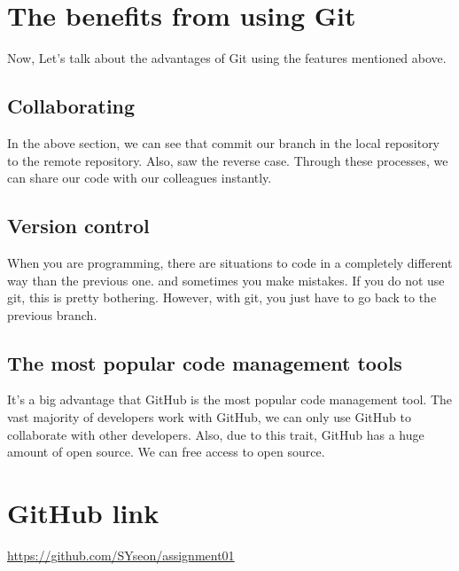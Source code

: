 \documentclass[11pt]{article}
\begin{document}
\pagebreak
\section{The benefits from using Git}
Now, Let's talk about the advantages of Git using the features mentioned above.
	\subsection{Collaborating}
	In the above section, we can see that commit our branch in the local repository to the remote repository. Also, saw the reverse case. Through these processes, we can share our code with our colleagues instantly.
	\subsection{Version control}
	When you are programming, there are situations to code in a completely different way than the previous one. and sometimes you make mistakes. If you do not use git, this is pretty bothering. However, with git, you just have to go back to the previous branch.
	\subsection{The most popular code management tools}
	It's a big advantage that GitHub is the most popular code management tool. The vast majority of developers work with GitHub, we can only use GitHub to collaborate with other developers. Also, due to this trait, GitHub has a huge amount of open source. We can free access to open source.

\section{GitHub link}
\href{https://github.com/SYseon/assignment01}{https://github.com/SYseon/assignment01}
\end{document}
